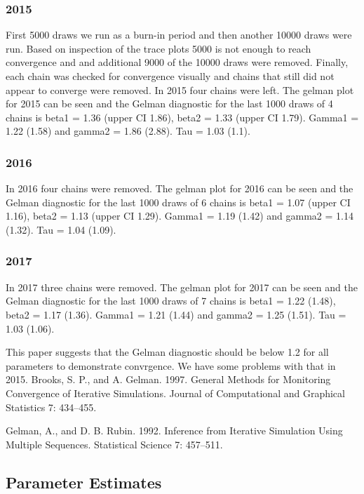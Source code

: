 \documentclass[letterpaper,12pt]{article}\usepackage[]{graphicx}\usepackage[]{color}
\begin{document}
\subsubsection{2015}
First 5000 draws we run as a burn-in period and then another 10000 draws were run.  Based on inspection of the trace plots 5000 is not enough to reach convergence and and additional 9000 of the 10000 draws were removed.  Finally, each chain was checked for convergence visually and chains that  still did not appear to converge were removed.  In 2015 four chains were left.  The gelman plot for 2015 can be seen and the Gelman diagnostic for the last 1000 draws of 4 chains is beta1 = 1.36 (upper CI 1.86), beta2 = 1.33 (upper CI 1.79).  Gamma1 = 1.22 (1.58) and gamma2 = 1.86 (2.88).  Tau = 1.03 (1.1).  

\subsubsection{2016}
 In 2016 four chains were removed.  The gelman plot for 2016 can be seen and the Gelman diagnostic for the last 1000 draws of 6 chains is beta1 = 1.07 (upper CI 1.16), beta2 = 1.13 (upper CI 1.29).  Gamma1 = 1.19 (1.42) and gamma2 = 1.14 (1.32).  Tau = 1.04 (1.09).  


\subsubsection{2017}
 In 2017 three chains were removed.  The gelman plot for 2017 can be seen and the Gelman diagnostic for the last 1000 draws of 7 chains is beta1 = 1.22 (1.48), beta2 = 1.17 (1.36).  Gamma1 = 1.21 (1.44) and gamma2 = 1.25 (1.51).  Tau = 1.03 (1.06).  


This paper suggests that the Gelman diagnostic should be below 1.2 for all parameters to demonstrate convrgence.  We have some problems with that in 2015.  
Brooks, S. P., and A. Gelman. 1997. General Methods for Monitoring Convergence of Iterative Simulations. Journal of Computational and Graphical Statistics 7: 434–455.

Gelman, A., and D. B. Rubin. 1992. Inference from Iterative Simulation Using Multiple Sequences. Statistical Science 7: 457–511.





\subsection{Parameter Estimates}
\end{document}
